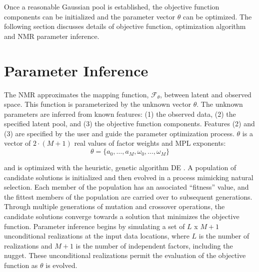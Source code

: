 Once a reasonable Gaussian pool is established, the objective function components can be initialized and the parameter vector $\theta$ can be optimized. The following section discusses details of objective function, optimization algorithm and \gls{NMR} parameter inference.




\FloatBarrier
\section{Parameter Inference}
\label{sec:04paraminfer}

The \gls{NMR} approximates the mapping function, $\mathcal{F}_{\theta}$, between latent and observed space. This function is parameterized by the unknown vector $\theta$. The unknown parameters are inferred from known features: (1) the observed data, (2) the specified latent pool, and (3) the objective function components. Features (2) and (3) are specified by the user and guide the parameter optimization process. $\theta$ is a vector of $2 \cdot (M+1)$ real values of factor weights and \gls{MPL} exponents:
\begin{equation}
    \theta = \{ a_{0}, \dots, a_{M}, \omega_{0}, \dots, \omega_{M} \}
    \label{eq:theta}
\end{equation}

and is optimized with the heuristic, genetic algorithm \gls{DE} \citep{price2013differential}. A population of candidate solutions is initialized and then evolved in a process mimicking natural selection. Each member of the population has an associated ``fitness'' value, and the fittest members of the population are carried over to subsequent generations. Through multiple generations of mutation and crossover operations, the candidate solutions converge towards a solution that minimizes the objective function. Parameter inference begins by simulating a set of $L$ x $M+1$ unconditional realizations at the input data locations, where $L$ is the number of realizations and $M+1$ is the number of independent factors, including the nugget. These unconditional realizations permit the evaluation of the objective function as $\theta$ is evolved.

